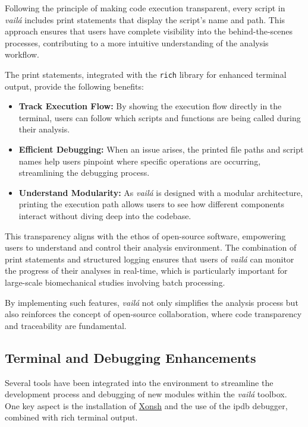 \documentclass{article}
\begin{document}
Following the principle of making code execution transparent, every script in \textit{vailá} includes print statements that display the script's name and path. This approach ensures that users have complete visibility into the behind-the-scenes processes, contributing to a more intuitive understanding of the analysis workflow.

The print statements, integrated with the \texttt{rich} library for enhanced terminal output, provide the following benefits:
\begin{itemize}
  \item \textbf{Track Execution Flow:} By showing the execution flow directly in the terminal, users can follow which scripts and functions are being called during their analysis.
  \item \textbf{Efficient Debugging:} When an issue arises, the printed file paths and script names help users pinpoint where specific operations are occurring, streamlining the debugging process.
  \item \textbf{Understand Modularity:} As \textit{vailá} is designed with a modular architecture, printing the execution path allows users to see how different components interact without diving deep into the codebase.
\end{itemize}

This transparency aligns with the ethos of open-source software, empowering users to understand and control their analysis environment. The combination of print statements and structured logging ensures that users of \textit{vailá} can monitor the progress of their analyses in real-time, which is particularly important for large-scale biomechanical studies involving batch processing.

By implementing such features, \textit{vailá} not only simplifies the analysis process but also reinforces the concept of open-source collaboration, where code transparency and traceability are fundamental.

\subsection{Terminal and Debugging Enhancements}

Several tools have been integrated into the environment to streamline the development process and debugging of new modules within the \textit{vailá} toolbox. One key aspect is the installation of \href{https://xon.sh/}{Xonsh} and the use of the ipdb debugger, combined with rich terminal output.
\end{document}
